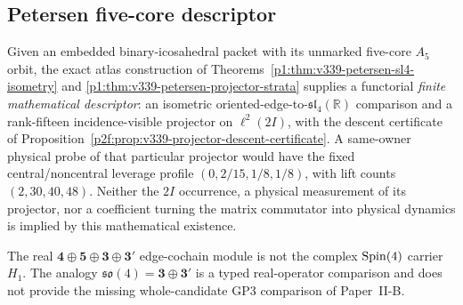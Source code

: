 \documentclass[12pt,a4paper]{article}
\begin{document}
\subsection{Petersen five-core descriptor}
\begin{corollary}
\label{p2e:cor:v339-petersen-operator-export}
Given an embedded binary-icosahedral packet with its unmarked
five-core $A_5$ orbit, the exact atlas construction
of Theorems~\ref{p1:thm:v339-petersen-sl4-isometry} and
\ref{p1:thm:v339-petersen-projector-strata} supplies a
functorial \emph{finite mathematical descriptor}: an isometric
oriented-edge-to-$\mathfrak{sl}_4(\mathbb R)$ comparison and a
rank-fifteen incidence-visible projector on $\ell^2(2I)$,
with the descent certificate of
Proposition~\ref{p2f:prop:v339-projector-descent-certificate}.
A same-owner physical probe of that particular projector would
have the fixed central/noncentral leverage profile
$(0,2/15,1/8,1/8)$, with lift counts $(2,30,40,48)$.
Neither the $2I$ occurrence, a physical measurement of its
projector, nor a coefficient turning the matrix commutator
into physical dynamics is implied by this mathematical existence.
\end{corollary}
\begin{remark}
The real $\mathbf4\oplus\mathbf5\oplus\mathbf3\oplus\mathbf3'$
edge-cochain module is not the complex $\mathrm{Spin}(4)$ carrier $H_1$.
The analogy $\mathfrak{so}(4)=\mathbf3\oplus\mathbf3'$ is a
typed real-operator comparison and does not provide the missing
whole-candidate GP3 comparison of Paper~II-B.
\end{remark}
\end{document}
